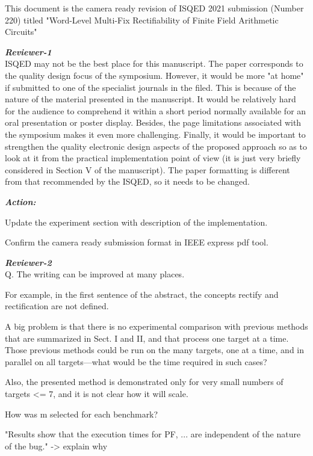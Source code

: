 This document is the camera ready revision of ISQED 2021 submission (Number 220) titled "Word-Level Multi-Fix Rectifiability of Finite Field Arithmetic Circuits"

\par {\it{\bf Reviewer-1}}\\
ISQED may not be the best place for this manuscript. The paper corresponds to the quality design focus of the symposium. However, it would be more "at home" if submitted to one of the specialist journals in the filed. This is because of the nature of the material presented in the manuscript. It would be relatively hard for the audience to comprehend it within a short period normally available for an oral presentation or poster display. Besides, the page limitations associated with the symposium makes it even more challenging. Finally, it would be important to strengthen the quality electronic design aspects of the proposed approach so as to look at it from the practical implementation point of view (it is just very briefly considered in Section V of the manuscript).       
The paper formatting is different from that recommended by the ISQED, so it needs to be changed.

\par {\it{\bf Action:}}
\bi
\item Update the experiment section with description of the implementation.
\item Confirm the camera ready submission format in IEEE express pdf tool.
\ei

\par {\it{\bf Reviewer-2}}\\
Q. The writing can be improved at many places.

For example, in the first sentence of the abstract, the concepts rectify and rectification are not defined.

A big problem is that there is no experimental comparison with previous methods that are summarized in Sect. I and II, and that process one target at a time.
Those previous methods could be run on the many targets, one at a time, and in parallel on all targets---what would be the time required in such cases?

Also, the presented method is demonstrated only for very small numbers of targets <= 7, and it is not clear how it will scale.

How was m selected for each benchmark?

"Results show that the execution times for PF, ... are independent of the nature of the bug." -> explain why

